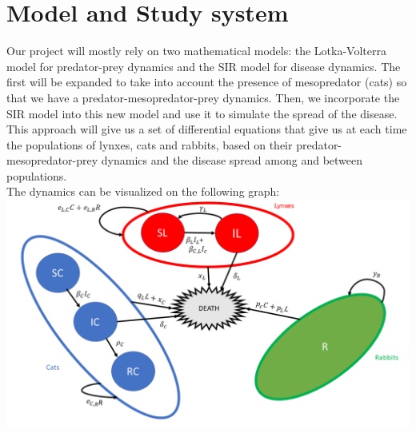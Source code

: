 \documentclass{article}
\begin{document}
\section{Model and Study system}
\quad Our project will mostly rely on two mathematical models: the Lotka-Volterra model for predator-prey dynamics and the SIR model for disease dynamics. The first will be expanded to take into account the presence of mesopredator (cats) so that we have a predator-mesopredator-prey dynamics. Then, we incorporate the SIR model into this new model and use it to simulate the spread of the disease. This approach will give us a set of differential equations that give us at each time the populations of lynxes, cats and rabbits, based on their predator-mesopredator-prey dynamics and the disease spread among and between populations.\\

\quad The dynamics can be visualized on the following graph:\\

\includegraphics[scale=0.8]{images/graph.png}
\end{document}
